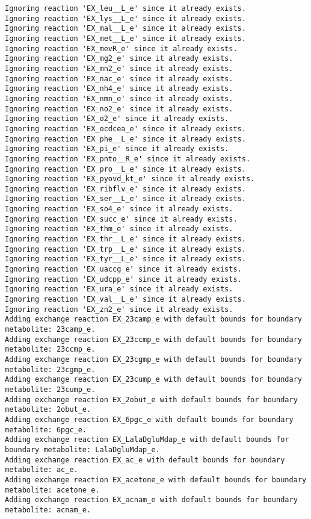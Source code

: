 \documentclass[
  letterpaper,
  DIV=11,
  numbers=noendperiod]{scrartcl}
\begin{document}
\begin{verbatim}
Ignoring reaction 'EX_leu__L_e' since it already exists.
Ignoring reaction 'EX_lys__L_e' since it already exists.
Ignoring reaction 'EX_mal__L_e' since it already exists.
Ignoring reaction 'EX_met__L_e' since it already exists.
Ignoring reaction 'EX_mevR_e' since it already exists.
Ignoring reaction 'EX_mg2_e' since it already exists.
Ignoring reaction 'EX_mn2_e' since it already exists.
Ignoring reaction 'EX_nac_e' since it already exists.
Ignoring reaction 'EX_nh4_e' since it already exists.
Ignoring reaction 'EX_nmn_e' since it already exists.
Ignoring reaction 'EX_no2_e' since it already exists.
Ignoring reaction 'EX_o2_e' since it already exists.
Ignoring reaction 'EX_ocdcea_e' since it already exists.
Ignoring reaction 'EX_phe__L_e' since it already exists.
Ignoring reaction 'EX_pi_e' since it already exists.
Ignoring reaction 'EX_pnto__R_e' since it already exists.
Ignoring reaction 'EX_pro__L_e' since it already exists.
Ignoring reaction 'EX_pyovd_kt_e' since it already exists.
Ignoring reaction 'EX_ribflv_e' since it already exists.
Ignoring reaction 'EX_ser__L_e' since it already exists.
Ignoring reaction 'EX_so4_e' since it already exists.
Ignoring reaction 'EX_succ_e' since it already exists.
Ignoring reaction 'EX_thm_e' since it already exists.
Ignoring reaction 'EX_thr__L_e' since it already exists.
Ignoring reaction 'EX_trp__L_e' since it already exists.
Ignoring reaction 'EX_tyr__L_e' since it already exists.
Ignoring reaction 'EX_uaccg_e' since it already exists.
Ignoring reaction 'EX_udcpp_e' since it already exists.
Ignoring reaction 'EX_ura_e' since it already exists.
Ignoring reaction 'EX_val__L_e' since it already exists.
Ignoring reaction 'EX_zn2_e' since it already exists.
Adding exchange reaction EX_23camp_e with default bounds for boundary metabolite: 23camp_e.
Adding exchange reaction EX_23ccmp_e with default bounds for boundary metabolite: 23ccmp_e.
Adding exchange reaction EX_23cgmp_e with default bounds for boundary metabolite: 23cgmp_e.
Adding exchange reaction EX_23cump_e with default bounds for boundary metabolite: 23cump_e.
Adding exchange reaction EX_2obut_e with default bounds for boundary metabolite: 2obut_e.
Adding exchange reaction EX_6pgc_e with default bounds for boundary metabolite: 6pgc_e.
Adding exchange reaction EX_LalaDgluMdap_e with default bounds for boundary metabolite: LalaDgluMdap_e.
Adding exchange reaction EX_ac_e with default bounds for boundary metabolite: ac_e.
Adding exchange reaction EX_acetone_e with default bounds for boundary metabolite: acetone_e.
Adding exchange reaction EX_acnam_e with default bounds for boundary metabolite: acnam_e.

\end{verbatim}
\end{document}
